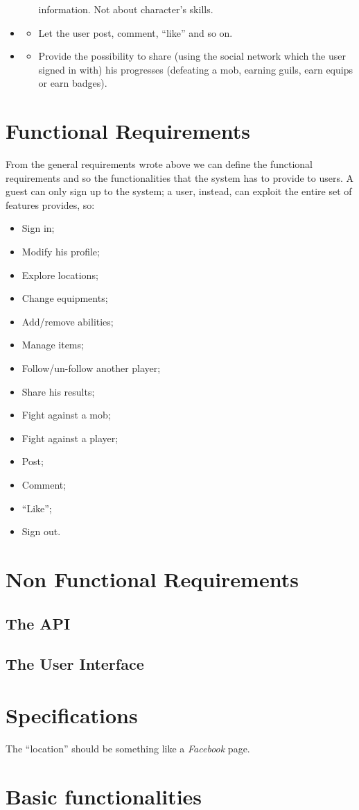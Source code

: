\begin{itemize}
\begin{itemize}
				information. Not about character's skills.
			\end{itemize}
		\item \textbf{\goalSocial}
			\begin{itemize}
				\item Let the user post, comment, ``like'' and so on.
			\end{itemize}
		\item \textbf{\goalShare}
			\begin{itemize}
				\item Provide the possibility to share (using the social network which the user signed in with) his 
				progresses (defeating a mob, earning guils, earn equips or earn badges).
			\end{itemize}
	\end{itemize}

	\section{Functional Requirements}
		From the general requirements wrote above we can define the functional requirements 
		and so the functionalities that the system has to provide to users. A guest can only sign up to the system; 
		a user, instead, can exploit the entire set of features provides, so:
		\begin{itemize}
			\item Sign in;
			\item Modify his profile;
			\item Explore locations;
			\item Change equipments;
			\item Add/remove abilities;
			\item Manage items;
			\item Follow/un-follow another player;
			\item Share his results;
			\item Fight against a mob;
			\item Fight against a player;
			\item Post;
			\item Comment;
			\item ``Like'';
			\item Sign out.
		\end{itemize}
	\section{Non Functional Requirements}
	\subsection{The API}
	\subsection{The User Interface}

	\section{Specifications}

	 The ``location'' should be something like a \textit{Facebook} page.

	 \section{Basic functionalities}